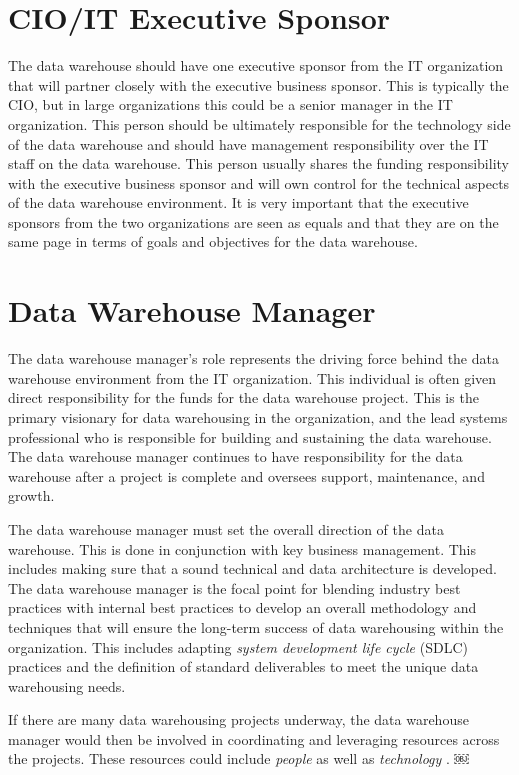 \documentclass{vldb}
\begin{document}
\section{CIO/IT Executive Sponsor}
The data warehouse should have one executive sponsor from the IT organization that will partner closely with the executive business sponsor. This is typically the CIO, but in large organizations this could be a senior manager in the IT organization. This person should be ultimately responsible for the technology side of the data warehouse and should have management responsibility over the IT staff on the data warehouse. This person usually shares the funding responsibility with the executive business sponsor and will own control for the technical aspects of the data warehouse environment. It is very important that the executive sponsors from the two organizations are seen as equals and that they are on the same page in terms of goals and objectives for the data warehouse. \cite{Reeves:DW}

\section{Data Warehouse Manager}
The data warehouse manager’s role represents the driving force behind the data warehouse environment from the IT organization. This individual is often given direct responsibility for the funds for the data warehouse project. This is the primary visionary for data warehousing in the organization, and the lead systems professional who is responsible for building and sustaining the data warehouse. The data warehouse manager continues to have responsibility for the data warehouse after a project is complete and oversees support, maintenance, and growth.

The data warehouse manager must set the overall direction of the data warehouse. This is done in conjunction with key business management. This includes making sure that a sound technical and data architecture is developed. The data warehouse manager is the focal point for blending industry best practices with internal best practices to develop an overall methodology and techniques that will ensure the long-term success of data warehousing within the organization. This includes adapting \textit{system development life cycle} (SDLC) practices and the definition of standard deliverables to meet the unique data warehousing needs.

If there are many data warehousing projects underway, the data warehouse manager would then be involved in coordinating and leveraging resources across the projects. These resources could include \textit{people} as well as \textit{technology} .
￼
\end{document}
